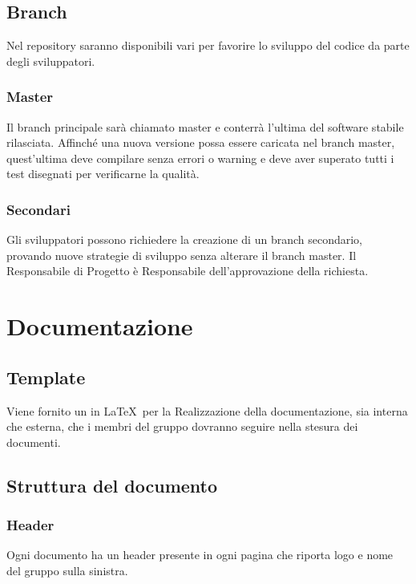 \subsection{Branch}
\label{4.4}
Nel repository saranno disponibili vari  per favorire lo sviluppo del codice da parte degli sviluppatori.

\subsubsection{Master}
\label{4.4.1}
Il branch principale sarà chiamato master e conterrà l'ultima  del software stabile rilasciata. Affinché una nuova versione possa essere caricata nel branch master, quest'ultima deve compilare senza errori o warning e deve aver superato tutti i test disegnati per verificarne la qualità.

\subsubsection{Secondari}
\label{4.4.2}
Gli sviluppatori possono richiedere la creazione di un branch secondario, provando nuove strategie di sviluppo senza alterare il branch master. Il Responsabile di Progetto è Responsabile dell'approvazione della richiesta.

\newpage
\section{Documentazione}
\label{5.0}

\subsection{Template}
\label{5.1}
Viene fornito un  in \LaTeX\ per la Realizzazione della documentazione, sia interna che esterna, che i membri del gruppo dovranno seguire nella stesura dei documenti.

\subsection{Struttura del documento}
\label{5.2}

\subsubsection{Header}
\label{5.2.1}
Ogni documento ha un header presente in ogni pagina che riporta logo e nome del gruppo sulla sinistra.


